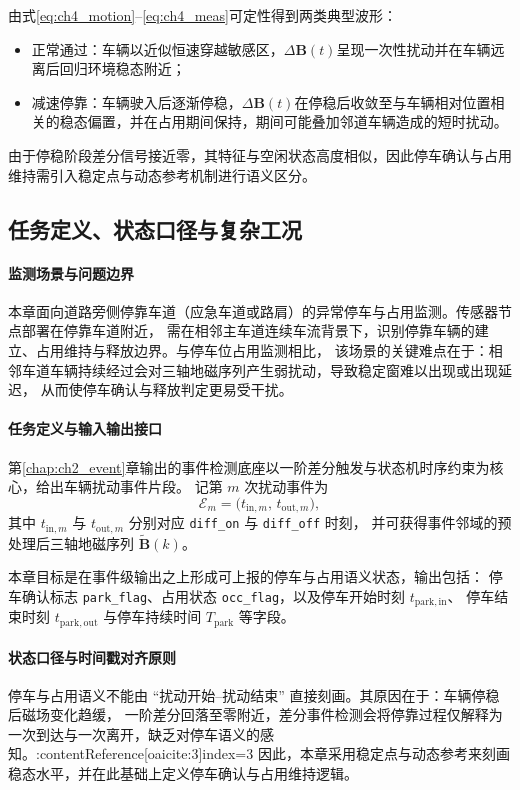 \documentclass{xdupgthesis}
\begin{document}
由式\eqref{eq:ch4_motion}--\eqref{eq:ch4_meas}可定性得到两类典型波形：
\begin{itemize}
  \item 正常通过：车辆以近似恒速穿越敏感区，$\Delta\mathbf{B}(t)$呈现一次性扰动并在车辆远离后回归环境稳态附近；
  \item 减速停靠：车辆驶入后逐渐停稳，$\Delta\mathbf{B}(t)$在停稳后收敛至与车辆相对位置相关的稳态偏置，并在占用期间保持，期间可能叠加邻道车辆造成的短时扰动。
\end{itemize}
由于停稳阶段差分信号接近零，其特征与空闲状态高度相似，因此停车确认与占用维持需引入稳定点与动态参考机制进行语义区分。
\subsection{任务定义、状态口径与复杂工况}
\label{subsec:ch4_definition}

\paragraph{监测场景与问题边界}
本章面向道路旁侧停靠车道（应急车道或路肩）的异常停车与占用监测。传感器节点部署在停靠车道附近，
需在相邻主车道连续车流背景下，识别停靠车辆的建立、占用维持与释放边界。与停车位占用监测相比，
该场景的关键难点在于：相邻车道车辆持续经过会对三轴地磁序列产生弱扰动，导致稳定窗难以出现或出现延迟，
从而使停车确认与释放判定更易受干扰。

\paragraph{任务定义与输入输出接口}
第\ref{chap:ch2_event}章输出的事件检测底座以一阶差分触发与状态机时序约束为核心，给出车辆扰动事件片段。
记第 $m$ 次扰动事件为
\begin{equation}
\mathcal{E}_m = \bigl(t_{\mathrm{in},m},\, t_{\mathrm{out},m}\bigr),
\end{equation}
其中 $t_{\mathrm{in},m}$ 与 $t_{\mathrm{out},m}$ 分别对应 \texttt{diff\_on} 与 \texttt{diff\_off} 时刻，
并可获得事件邻域的预处理后三轴地磁序列 $\widetilde{\mathbf{B}}(k)$。

本章目标是在事件级输出之上形成可上报的停车与占用语义状态，输出包括：
停车确认标志 \texttt{park\_flag}、占用状态 \texttt{occ\_flag}，以及停车开始时刻 $t_{\mathrm{park,in}}$、
停车结束时刻 $t_{\mathrm{park,out}}$ 与停车持续时间 $T_{\mathrm{park}}$ 等字段。

\paragraph{状态口径与时间戳对齐原则}
停车与占用语义不能由 ``扰动开始--扰动结束'' 直接刻画。其原因在于：车辆停稳后磁场变化趋缓，
一阶差分回落至零附近，差分事件检测会将停靠过程仅解释为一次到达与一次离开，缺乏对停车语义的感知。:contentReference[oaicite:3]{index=3}
因此，本章采用稳定点与动态参考来刻画稳态水平，并在此基础上定义停车确认与占用维持逻辑。
\end{document}
